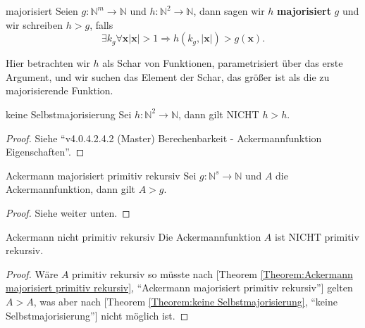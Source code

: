 \documentclass[a4paper]{amsart}
\theoremstyle{definition}
\newcommand{\myRef}[2]{[#1 \ref{#1:#2}, ``#2'']}
\newcommand{\N}{\ensuremath{\mathbb{ N }}}
\newcommand{\bb}[1]{\mathbf{#1}}
\begin{document}
\begin{Definition}{majorisiert}
    Seien $g \colon \N^m \to \N$ und $h \colon \N^2 \to \N$, dann sagen wir $h$ \textbf{majorisiert} $g$
    und wir schreiben $h > g$,
    falls
    \begin{equation*}
        \exists k_g \forall \bb{x} |\bb{x}| > 1 \Rightarrow h( k_g,  |\bb{x}| ) > g(  \bb{x} ).
    \end{equation*}
   
\end{Definition}
Hier betrachten wir $h$ als Schar von Funktionen, parametrisiert über das erste Argument, und wir suchen
das Element der Schar, das größer ist als die zu majorisierende Funktion.

\begin{Theorem}{keine Selbstmajorisierung}
    Sei $h \colon \N^2 \to \N$, dann gilt NICHT $h > h$.   
\end{Theorem}
\begin{proof}
    Siehe "`v4.0.4.2.4.2 (Master) Berechenbarkeit - Ackermannfunktion Eigenschaften"'. 
\end{proof}

\begin{Theorem}{Ackermann majorisiert primitiv rekursiv}
    Sei $g \colon \N^s \to \N$ und $A$ die Ackermannfunktion, dann gilt $A > g$.   
\end{Theorem}
\begin{proof}
    Siehe weiter unten. 
\end{proof}

\begin{Theorem}{Ackermann nicht primitiv rekursiv}
    Die Ackermannfunktion $A$ ist NICHT primitiv rekursiv. 
\end{Theorem}
\begin{proof}
    Wäre $A$ primitiv rekursiv so müsste nach \myRef{Theorem}{Ackermann majorisiert primitiv rekursiv} 
    gelten $A > A$, was aber nach \myRef{Theorem}{keine Selbstmajorisierung} nicht möglich ist.
\end{proof}

\end{document}
